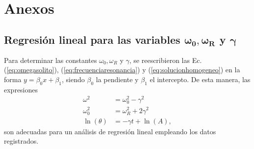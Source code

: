\section*{Anexos}
\subsection*{Regresión lineal para las variables $\mathbf{\omega_0, \omega_R}$ y $\mathbf{\gamma}$}

Para determinar las constantes $\omega_0, \omega_R$ y $\gamma$, se reescribieron las
Ec. (\ref{eq:omegasolito}), (\ref{eq:frecuenciaresonancia}) y (\ref{eq:solucionhomogeneo})
en la forma $y = \beta_0 x + \beta_1$, siendo $\beta_0$ la pendiente y $\beta_1$ el intercepto.
De esta manera, las expresiones
\begin{align*}
	\omega^2 &= \omega_0^2 - \gamma^2 \\
	\omega_0^2 &= \omega_R^2 + 2\gamma^2 \\
	\ln(\theta) &= -\gamma t + \ln(A),
\end{align*}
son adecuadas para un análisis de regresión lineal empleando los datos registrados.